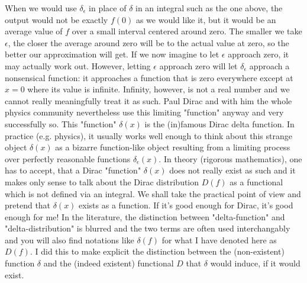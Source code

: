 When we would use $\delta_{\epsilon}$ in place of $\delta$ in an integral such as the one above, the output would not be exactly $f(0)$ as we would like it, but it would be an average value of $f$ over a small interval centered around zero. The smaller we take $\epsilon$, the closer the average around zero will be to the actual value at zero, so the better our approximation will get. If we now imagine to let $\epsilon$ approach zero, it may actually work out. However, letting  $\epsilon$ approach zero will let $\delta_{\epsilon}$ approach a nonsensical function: it approaches a function that is zero everywhere except at $x=0$ where its value is infinite. Infinity, however, is not a real number and we cannot really meaningfully treat it as such. Paul Dirac and with him the whole physics community nevertheless use this limiting "function" anyway and very successfully so. This "function" $\delta(x)$ is the (in)famous Dirac delta function. In practice (e.g. physics), it usually works well enough to think about this strange object $\delta(x)$ as a bizarre function-like object resulting from a limiting process over perfectly reasonable functions $\delta_{\epsilon}(x)$. In theory (rigorous mathematics), one has to accept, that a Dirac "function"  $\delta(x)$ does not really exist as such and it makes only sense to talk about the Dirac distribution $D(f)$ as a functional which is not defined via an integral. We shall take the practical point of view and pretend that $\delta(x)$ exists as a function. If it's good enough for Dirac, it's good enough for me! In the literature, the distinction between "delta-function" and "delta-distribution" is blurred and the two terms are often used interchangably and you will also find notations like $\delta(f)$ for what I have denoted here as $D(f)$. I did this to make explicit the distinction between the (non-existent) function $\delta$ and the (indeed existent) functional $D$ that $\delta$ would induce, if it would exist.


